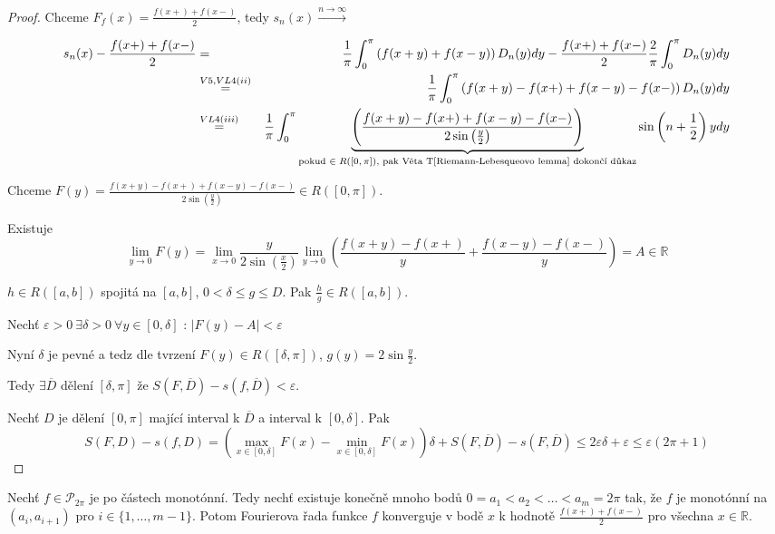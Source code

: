 \begin{proof}
Chceme $F_f(x) = \frac{f(x+) + f(x-)}{2}$, tedy $s_n(x) \overset{n \rightarrow \infty}{\rightarrow}$

\begin{eqnarray*}
s_n(x) - \frac{f(x+)+f(x-)}{2} & = & \frac{1}{\pi} \int_0^\pi \left( f(x+y) + f(x-y) \right) D_n(y) dy - \frac{f(x+) + f(x-)}{2} \frac{2}{\pi} \int_0^\pi D_n(y)dy \\
& \overset{V5, VL4 (ii)}{=} & \frac{1}{\pi} \int_0^\pi \left( f(x+y) - f(x+) + f(x-y) - f(x-) \right) D_n(y) dy \\
& \overset{VL4(iii)}{=} & \frac{1}{\pi} \int_{0}^\pi \underbrace{\left( \frac{f(x+y) - f(x+) + f(x-y) - f(x-)}{2 \sin \left( \frac{y}{2} \right)} \right)}_{\textrm{pokud $\in R([0,\pi])$, pak Věta T\ref{Riemann-Lebesqueovo lemma} dokončí důkaz}} \sin \left( n + \frac{1}{2} \right)y dy 
\end{eqnarray*}

Chceme $F(y) = \frac{f(x+y) - f(x+) + f(x-y) - f(x-)}{2 \sin \left( \frac{y}{2} \right)} \in R([0,\pi])$. 

Existuje
$$\lim_{y \rightarrow 0} F(y) = \lim_{x \rightarrow 0} \frac{y}{2 \sin \left( \frac{x}{2} \right)} \lim_{y \rightarrow 0} \left( \frac{f(x+y)-f(x+)}{y} + \frac{f(x-y)-f(x-)}{y} \right) = A \in \mathbb{R}$$

\begin{tvrzeni}
$h \in R([a,b])$ spojitá na $[a,b]$, $0 < \delta \leq g \leq D$. Pak $\frac{h}{g} \in R([a,b])$.
\end{tvrzeni}

Nechť $\varepsilon > 0 \ \exists \delta > 0 \ \forall y \in [0, \delta] \textrm{ : } |F(y)-A| < \varepsilon$

Nyní $\delta$ je pevné a tedz dle tvrzení $F(y) \in R([\delta, \pi])$, $g(y) = 2 \sin \frac{y}{2}$.

Tedy $\exists \overline{D}$ dělení $[\delta, \pi]$ že $S(F,\overline{D}) - s(f,\overline{D}) < \varepsilon$.

Nechť $D$ je dělení $[0,\pi]$ mající interval k $\overline{D}$ a interval k $[0, \delta]$. Pak 
$$S(F, D)-s(f,D) = \left( \max_{x \in [0, \delta]} F(x) - \min_{x \in [0, \delta]} F(x) \right) \delta + S(F, \overline{D}) - s(F, \overline{D}) \leq 2 \varepsilon \delta + \varepsilon \leq \varepsilon (2 \pi + 1)$$
\end{proof}

\begin{vetabd}
Nechť $f \in \mathcal{P}_{2\pi}$ je po částech monotónní. Tedy nechť existuje konečně mnoho bodů $0=a_1 < a_2 < \ldots < a_m = 2 \pi$ tak, že $f$ je monotónní na $(a_i, a_{i+1})$ pro $i \in \{1, \ldots, m-1 \}$. Potom Fourierova řada funkce $f$ konverguje v bodě $x$ k hodnotě $\frac{f(x+) + f(x-)}{2}$ pro všechna $x \in \mathbb{R}$.
\end{vetabd}